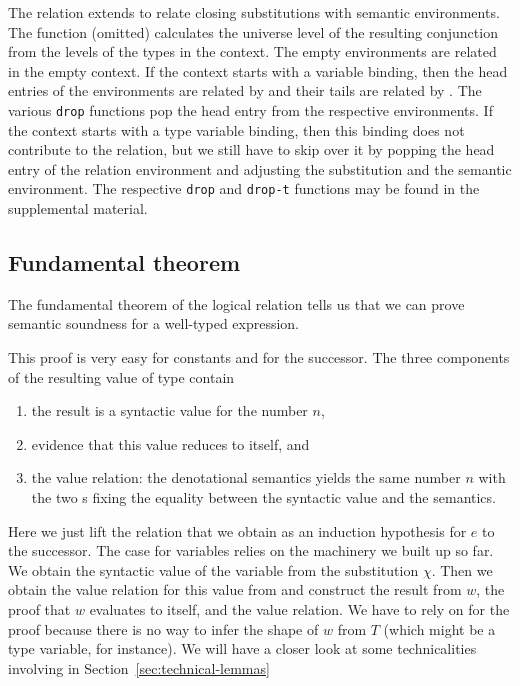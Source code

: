 \documentclass[acmsmall,anonymous,review,screen]{acmart}
\begin{document}
The relation {\AGSem} extends {\AVSem} to relate closing substitutions
with semantic environments. The {\AlevelEnv} function (omitted) calculates the universe level
of the resulting conjunction from the levels of the types in the
context.
\LogicalMCG
The empty environments are related in the empty context.
If the context starts with a variable binding, then the head entries of
the environments are related by {\AVSem} and their tails are
related by {\AGSem}.
The various \texttt{drop} functions pop the head entry from the
respective environments.
If the context starts with a type variable binding, then this binding
does not contribute to the relation, but we still have to skip over it
by popping the head entry of the relation environment and adjusting the
substitution and the semantic environment.
The respective \texttt{drop} and \texttt{drop-t} functions may be
found in the supplemental material.

\subsection{Fundamental theorem}
\label{sec:fundamental}

The fundamental theorem of the logical relation tells us that we can
prove semantic soundness for a well-typed expression.
\FundamentalFundamentalType

This proof is very easy for constants and for the successor.
\FundamentalFundamentalConstant
The three components of the resulting value of type {\AESem} contain
\begin{enumerate}
\item the result is a syntactic value for the number $n$,
\item evidence that this value reduces to itself, and
\item the value relation: the denotational semantics yields the same
  number $n$ with the two {\Arefl}s fixing the equality between the
  syntactic value and the semantics. 
\end{enumerate}
\FundamentalFundamentalSuccessor
Here we just lift the relation that we obtain as an induction
hypothesis for $e$ to the successor.
\FundamentalFundamentalVariable
The case for variables relies on the machinery we built up so
far. We obtain the syntactic value of the variable from the
substitution $\chi$. Then we obtain the value relation for this value
from {\AGSem} and construct the result from $w$, the proof that $w$
evaluates to itself, and the value relation. We have to rely on
{\AValueDown} for the proof because there is no way to infer the shape
of $w$ from $T$ (which might be a type variable, for instance).
We will have a closer look at some technicalities involving
{\AGLookup} in Section~\ref{sec:technical-lemmas}  
\end{document}
